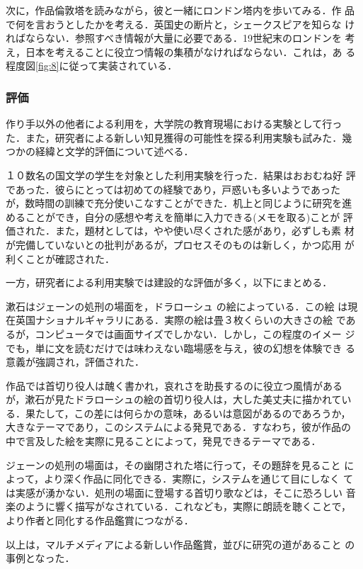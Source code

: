 次に，作品倫敦塔を読みながら，彼と一緒にロンドン塔内を歩いてみる．作
品で何を言おうとしたかを考える．英国史の断片と，シェークスピアを知らな
ければならない．参照すべき情報が大量に必要である．19世紀末のロンドンを
考え，日本を考えることに役立つ情報の集積がなければならない．これは，あ
る程度図\ref{fig:8}に従って実装されている．

\subsubsection{評価}
作り手以外の他者による利用を，大学院の教育現場における実験として行っ
た．また，研究者による新しい知見獲得の可能性を探る利用実験も試みた．幾
つかの経緯と文学的評価について述べる．

１０数名の国文学の学生を対象とした利用実験を行った．結果はおおむね好
評であった．彼らにとっては初めての経験であり，戸惑いも多いようであった
が，数時間の訓練で充分使いこなすことができた．机上と同じように研究を進
めることができ，自分の感想や考えを簡単に入力できる(メモを取る)ことが
評価された．また，題材としては，やや使い尽くされた感があり，必ずしも素
材が完備していないとの批判があるが，プロセスそのものは新しく，かつ応用
が利くことが確認された．

一方，研究者による利用実験では建設的な評価が多く，以下にまとめる．

 漱石はジェーンの処刑の場面を，ドラローシュ
\setcounter{footnote}{0}\footnotemark の絵によっている．この絵
は現在英国ナショナルギャラリにある．実際の絵は畳３枚くらいの大きさの絵
であるが，コンピュータでは画面サイズでしかない．しかし，この程度のイメー
ジでも，単に文を読むだけでは味わえない臨場感を与え，彼の幻想を体験でき
る意義が強調され，評価された．

作品では首切り役人は醜く書かれ，哀れさを助長するのに役立つ風情がある
が，漱石が見たドラローシュの絵の首切り役人は，大した美丈夫に描かれてい
る．果たして，この差には何らかの意味，あるいは意図があるのであろうか，
大きなテーマであり，このシステムによる発見である．すなわち，彼が作品の
中で言及した絵を実際に見ることによって，発見できるテーマである．

ジェーンの処刑の場面は，その幽閉された塔に行って，その題辞を見ること
によって，より深く作品に同化できる．実際に，システムを通じて目にしなく
ては実感が湧かない．処刑の場面に登場する首切り歌などは，そこに恐ろしい
音楽のように響く描写がなされている．これなども，実際に朗読を聴くことで，
より作者と同化する作品鑑賞につながる．

以上は，マルチメディアによる新しい作品鑑賞，並びに研究の道があること
の事例となった．

